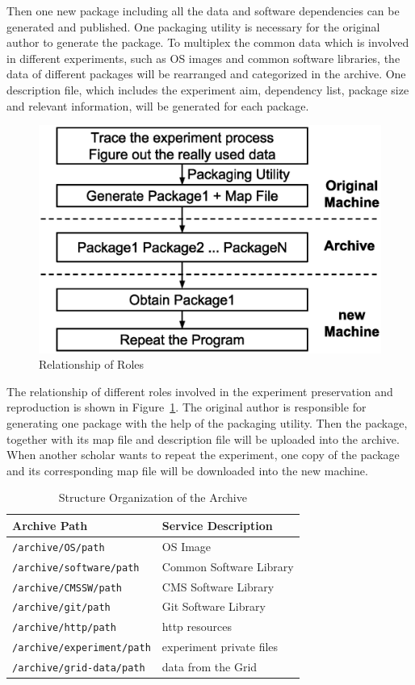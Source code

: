 \documentclass{acm_proc_article-sp}
\begin{document}
Then one new package including all the data and software dependencies can be generated and published. 
One packaging utility is necessary for the original author to generate the package. 
To multiplex the common data which is involved in different experiments, such as OS images and common software libraries, the data of different packages will be rearranged and categorized in the archive.
One description file, which includes the experiment aim, dependency list,  package size and relevant information, will be generated for each package.

\begin{figure}
\centering
\includegraphics[width=.8\columnwidth]{solution3.eps}
\caption{Relationship of Roles}
\label{fig:solution3}
\end{figure}

The relationship of different roles involved in the experiment preservation and
reproduction is shown in Figure~\ref{fig:solution3}.  The original author is
responsible for generating one package with the help of the packaging utility. Then the package, together with
its map file and description file will be uploaded into the archive. When
another scholar wants to repeat the experiment, one copy of the package and its
corresponding map file will be downloaded into the new machine.

\begin{table}
    \centering
    \begin{tabular}{|l|l|}
        \hline
        Archive Path & Service Description \\ \hline
        {\tt /archive/OS/path} & OS Image \\ \hline
        {\tt /archive/software/path} & Common Software Library \\ \hline
        {\tt /archive/CMSSW/path} & CMS Software Library \\ \hline
        {\tt /archive/git/path} & Git Software Library \\ \hline
        {\tt /archive/http/path} & http resources \\ \hline
        {\tt /archive/experiment/path} & experiment private files \\ \hline
        {\tt /archive/grid-data/path} & data from the Grid \\ \hline
    \end{tabular}
    \caption{Structure Organization of the Archive}
    \label{table:archive-map}
\end{table}
\end{document}
